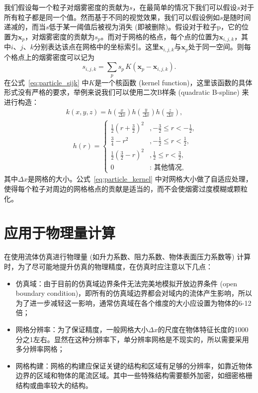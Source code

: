 我们假设每一个粒子对烟雾密度的贡献为$s$，在最简单的情况下我们可以假设$s$对于所有粒子都是同一个值。然而基于不同的视觉效果，我们可以假设例如$s$是随时间递减的，而当$s$低于某一阈值后被视为消失 (即被删除)。假设对于粒子p，它的位置为$\mathbf{x}_p$，对烟雾密度的贡献为$s_p$。而对于网格的格点，每个点的位置为$\mathbf{x}_{i,j,k}$，其中$i$、$j$、$k$分别表达该点在网格中的坐标索引。这里$\mathbf{x}_{i,j,k}$与$\mathbf{x}_p$处于同一空间。则每个格点上的烟雾密度可以记为
\begin{equation}
    s_{i,j,k}=\sum_p s_p \, K(\mathbf{x}_p-\mathbf{x}_{i,j,k}).
    \label{eq:particle_sijk}
\end{equation}
在公式~\ref{eq:particle_sijk} 中$K$是一个核函数 (kernel function)，这里该函数的具体形式没有严格的要求，举例来说我们可以使用二次B样条 (quadratic B-spline) 来进行构造：
\begin{align}
\label{eq:particle_kernel}
& k(x, y, z)= h\left(\frac{x}{\Delta x}\right) h\left(\frac{y}{\Delta x}\right) h\left(\frac{z}{\Delta x}\right), \\
& \quad h(r)=\left\{\begin{array}{cl}
\frac{1}{2}\left(r+\frac{3}{2}\right)^{2} & ,-\frac{3}{2} \leq r<-\frac{1}{2}, \\
\frac{3}{4}-r^{2} & ,-\frac{1}{2} \leq r<\frac{1}{2}, \\
\frac{1}{2}\left(\frac{3}{2}-r\right)^{2} & ,\frac{1}{2} \leq r<\frac{3}{2}, \\
0 & : \text { 其他情况, }
\end{array}\right.
\end{align}
其中$\Delta x$是网格的大小。公式~\ref{eq:particle_kernel} 中对网格大小做了自适应处理，使得每个粒子对周边的网格格点的贡献是适当的，而不会使烟雾过度模糊或颗粒化。

\section{应用于物理量计算}
在使用流体仿真进行物理量 (如升力系数、阻力系数、物体表面压力系数等) 计算时，为了尽可能地提升仿真的物理精度，在仿真时应注意以下几点：
\begin{itemize}
    \item 仿真域：由于目前的仿真域边界条件无法完美地模拟开放边界条件 (open boundary condition)，即所有的仿真域边界都会对域内的流体产生影响，所以为了进一步减轻这一影响，通常仿真域在各个维度的大小应设置为物体的6-12倍；
    \item 网格分辨率：为了保证精度，一般网格大小$\Delta x$的尺度在物体特征长度的1000分之1左右。显然在这种分辨率下，单分辨率网格是不现实的，所以需要采用多分辨率网格；
    \item 网格构建：网格的构建应保证关键的结构和区域有足够的分辨率，如靠近物体边界的区域和物体的尾流区域。其中一些特殊结构需要额外加密，如细密格栅结构或曲率较大的结构。
  \end{itemize}

